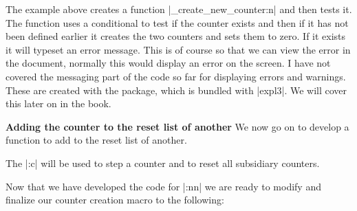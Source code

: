 The example above creates a function |\phd_create_new_counter:n| and then tests it. The function uses a conditional to test if the counter exists  and then if it has not been defined earlier it creates the two counters and sets them to zero. If it exists it will typeset an error message. This is of course so that we can view the error in the document, normally this would display an error on the screen. I have not covered the messaging part of the code so far for displaying errors and warnings. These are created with the  package, which is bundled with |expl3|. We will cover this later on in the book. 

\textbf{Adding the counter to the reset list of another} We now go on to develop a function to add to the reset list of another.


The |\stepcounter:c| will be used to step a counter and to reset all subsidiary counters. 



Now that we have developed the code for |\addtoreset:nn| we are ready to modify and finalize our counter creation macro to the following:


